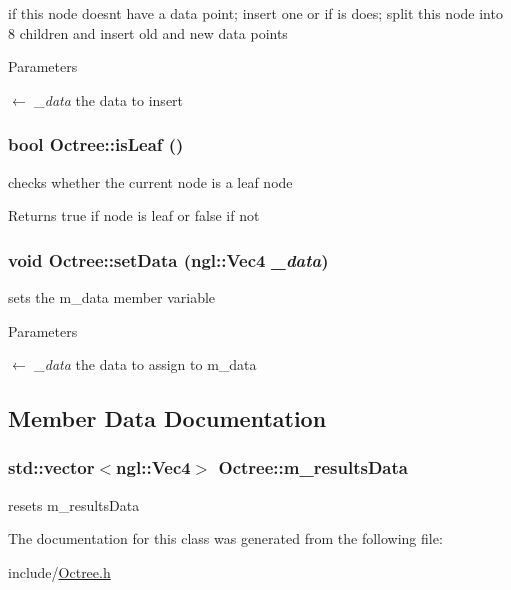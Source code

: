 if this node doesnt have a data point; insert one or if is does; split this node into 8 children and insert old and new data points 
\begin{DoxyParams}{Parameters}
\item[\mbox{$\leftarrow$} {\em \_\-data}]the data to insert \end{DoxyParams}
\hypertarget{classOctree_a5311ba068ebb82dbc917e0178f052ec0}{
\subsubsection[{isLeaf}]{\setlength{\rightskip}{0pt plus 5cm}bool Octree::isLeaf ()}}
\label{classOctree_a5311ba068ebb82dbc917e0178f052ec0}


checks whether the current node is a leaf node \begin{DoxyReturn}{Returns}
true if node is leaf or false if not 
\end{DoxyReturn}
\hypertarget{classOctree_a5e902807821df11683179aea5e43d731}{
\subsubsection[{setData}]{\setlength{\rightskip}{0pt plus 5cm}void Octree::setData (ngl::Vec4 {\em \_\-data})}}
\label{classOctree_a5e902807821df11683179aea5e43d731}


sets the m\_\-data member variable 
\begin{DoxyParams}{Parameters}
\item[\mbox{$\leftarrow$} {\em \_\-data}]the data to assign to m\_\-data \end{DoxyParams}


\subsection{Member Data Documentation}
\hypertarget{classOctree_a6260225ce5323751e8053cfd4597f2cd}{
\subsubsection[{m\_\-resultsData}]{\setlength{\rightskip}{0pt plus 5cm}std::vector$<$ngl::Vec4$>$ {\bf Octree::m\_\-resultsData}}}
\label{classOctree_a6260225ce5323751e8053cfd4597f2cd}


resets m\_\-resultsData 

The documentation for this class was generated from the following file:\begin{DoxyCompactItemize}
\item 
include/\hyperlink{Octree_8h}{Octree.h}\end{DoxyCompactItemize}
